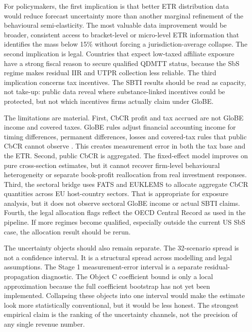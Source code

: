 \documentclass[11pt,a4paper]{article}
\begin{document}
For policymakers, the first implication is that better ETR distribution data would reduce forecast uncertainty more than another marginal refinement of the behavioural semi-elasticity. The most valuable data improvement would be broader, consistent access to bracket-level or micro-level ETR information that identifies the mass below 15\% without forcing a jurisdiction-average collapse. The second implication is legal. Countries that expect low-taxed affiliate exposure have a strong fiscal reason to secure qualified QDMTT status, because the SbS regime makes residual IIR and UTPR collection less reliable. The third implication concerns tax incentives. The SBTI results should be read as capacity, not take-up: public data reveal where substance-linked incentives could be protected, but not which incentives firms actually claim under GloBE.

The limitations are material. First, CbCR profit and tax accrued are not GloBE income and covered taxes. GloBE rules adjust financial accounting income for timing differences, permanent differences, losses and covered-tax rules that public CbCR cannot observe \citep{hanlon2023}. This creates measurement error in both the tax base and the ETR. Second, public CbCR is aggregated. The fixed-effect model improves on pure cross-section estimates, but it cannot recover firm-level behavioural heterogeneity or separate book-profit reallocation from real investment responses. Third, the sectoral bridge uses FATS and EUKLEMS to allocate aggregate CbCR quantities across EU host-country sectors. That is appropriate for exposure analysis, but it does not observe sectoral GloBE income or actual SBTI claims. Fourth, the legal allocation flags reflect the OECD Central Record as used in the pipeline. If more regimes become qualified, especially outside the current US SbS case, the allocation result should be rerun.

The uncertainty objects should also remain separate. The 32-scenario spread is not a confidence interval. It is a structural spread across modelling and legal assumptions. The Stage 1 measurement-error interval is a separate residual-propagation diagnostic. The Object C coefficient bound is only a local approximation because the full coefficient bootstrap has not yet been implemented. Collapsing these objects into one interval would make the estimate look more statistically conventional, but it would be less honest. The strongest empirical claim is the ranking of the uncertainty channels, not the precision of any single revenue number.
\end{document}
